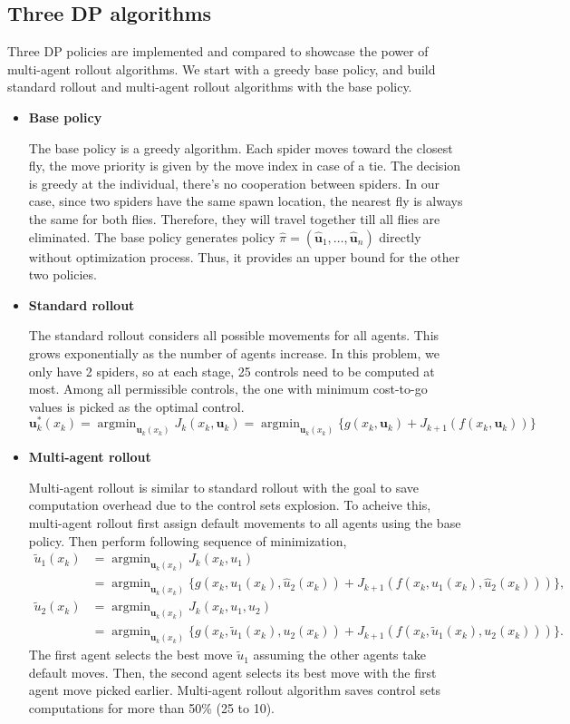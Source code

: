 \documentclass[11pt]{article}
\newcommand{\sample}[1]{#1_1 , \dots , #1_n}
\DeclareMathOperator*{\argmin}{\arg\min}
\begin{document}
\subsection*{Three DP algorithms}
Three DP policies are implemented and compared to showcase the power of multi-agent rollout algorithms. We start with a greedy base policy, and build standard rollout and multi-agent rollout algorithms with the base policy.


\begin{itemize}
    \item \textbf{Base policy}

    The base policy is a greedy algorithm. Each spider moves toward the closest fly, the move priority is given by the move index in case of a tie. The decision is greedy at the individual, there's no cooperation between spiders. In our case, since two spiders have the same spawn location, the nearest fly is always the same for both flies. Therefore, they will travel together till all flies are eliminated. The base policy generates policy $\hat \pi = (\sample{\hat{\boldsymbol u}})$ directly without optimization process. Thus, it provides an upper bound for the other two policies.
    \item \textbf{Standard rollout}
    
    The standard rollout considers all possible movements for all agents. This grows exponentially as the number of agents increase. In this problem, we only have 2 spiders, so at each stage, 25 controls need to be computed at most. Among all permissible controls, the one with minimum cost-to-go values is picked as the optimal control.
    \[
    \boldsymbol u_k^*(x_k) = \argmin_{\boldsymbol u_k(x_k)} J_k(x_k, \boldsymbol u_k) = \argmin_{\boldsymbol u_k(x_k)} \{g(x_k, \boldsymbol u_k) + J_{k+1}(f(x_k, \boldsymbol u_k))\}
    \]
    \item \textbf{Multi-agent rollout}

    Multi-agent rollout is similar to standard rollout with the goal to save computation overhead due to the control sets explosion. To acheive this, multi-agent rollout first assign default movements to all agents using the base policy. Then perform following sequence of minimization,
    \begin{align*}
    \tilde u_1(x_k) &= \argmin_{\boldsymbol u_k(x_k)} J_k(x_k, u_1) \\
    &= \argmin_{\boldsymbol u_k(x_k)} \{g(x_k, u_1(x_k), \hat u_2(x_k)) + J_{k+1}(f(x_k, u_1(x_k), \hat u_2(x_k)))\}, \\
    \tilde u_2(x_k) &= \argmin_{\boldsymbol u_k(x_k)} J_k(x_k, u_1, u_2)\\
    &= \argmin_{\boldsymbol u_k(x_k)} \{g(x_k, \tilde u_1(x_k), u_2(x_k)) + J_{k+1}(f(x_k, \tilde u_1(x_k), u_2(x_k)))\}.
    \end{align*}
    The first agent selects the best move $\tilde u_1$ assuming the other agents take default moves. Then, the second agent selects its best move with the first agent move picked earlier.
    Multi-agent rollout algorithm saves control sets computations for more than 50\% (25 to 10).
    
\end{itemize}
\end{document}
